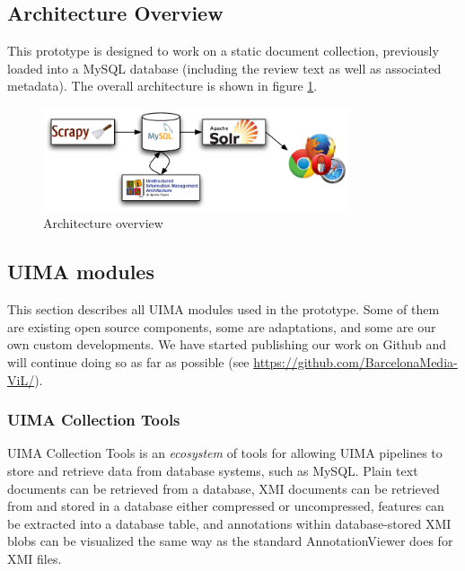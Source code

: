 \documentclass{llncs}
\begin{document}
\subsection{Architecture Overview}

This prototype is designed to work on a static document collection, previously loaded into a MySQL database (including the review text as well as associated metadata). The overall architecture is shown in figure \ref{fig:arch}.

\begin{figure}[ht]
\centering
\includegraphics[width=9cm]{arch.pdf}
\caption{Architecture overview}
\label{fig:arch}
\end{figure}


\subsection{UIMA modules}

This section describes all UIMA modules used in the prototype. Some of them are existing open source components, some are adaptations, and some are our own custom developments. We have started publishing our work on Github and will continue doing so as far as possible (see \url{https://github.com/BarcelonaMedia-ViL/}).

\subsubsection{UIMA Collection Tools}

UIMA Collection Tools is an \emph{ecosystem} of tools for allowing UIMA pipelines to store and retrieve data from database systems, such as MySQL.
Plain text documents can be retrieved from a database, XMI documents can be retrieved from and stored in a database either compressed or uncompressed, features can be extracted into a database table, and annotations within database-stored XMI blobs can be visualized the same way as the standard AnnotationViewer does for XMI files.
\end{document}
